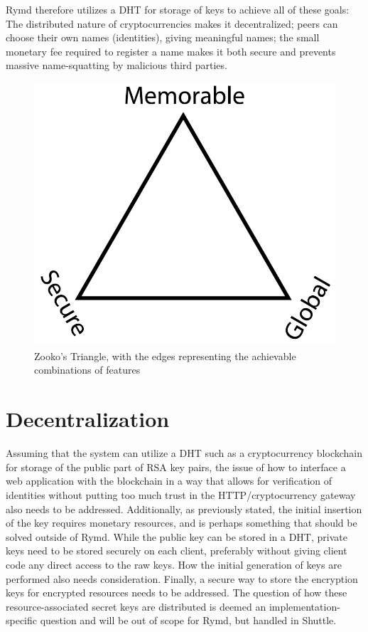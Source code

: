 Rymd therefore utilizes a DHT for storage of keys to achieve all of these goals: The distributed nature of cryptocurrencies makes it decentralized; peers can choose their own names (identities), giving meaningful names; the small monetary fee required to register a name makes it both secure and prevents massive name-squatting by malicious third parties.

\begin{figure}[h]
\centering
\includegraphics[width=\textwidth,height=0.2\paperheight,keepaspectratio
]{figures/Zooko_s_Triangle}
\caption{Zooko's Triangle, with the edges representing the achievable combinations of features \cite{Zooko:2001:Online}}
\label{fig:zooko}
\end{figure}

\section{Decentralization}

Assuming that the system can utilize a DHT such as a cryptocurrency blockchain for storage of the public part of RSA key pairs, the issue of how to interface a web application with the blockchain in a way that allows for verification of identities without putting too much trust in the HTTP/cryptocurrency gateway also needs to be addressed. Additionally, as previously stated, the initial insertion of the key requires monetary resources, and is perhaps something that should be solved outside of Rymd.
While the public key can be stored in a DHT, private keys need to be stored securely on each client, preferably without giving client code any direct access to the raw keys. How the initial generation of keys are performed also needs consideration. Finally, a secure way to store the encryption keys for encrypted resources needs to be addressed. The question of how these resource-associated secret keys are distributed is deemed an implementation-specific question and will be out of scope for Rymd, but handled in Shuttle.

